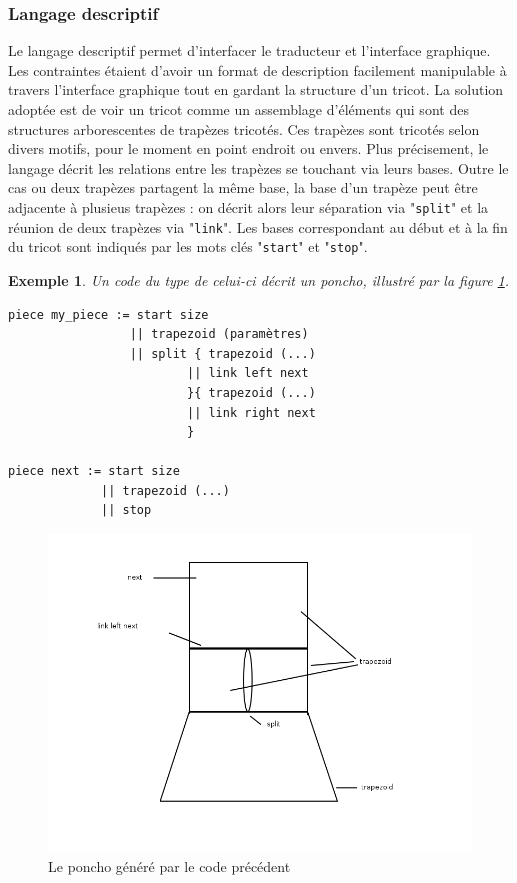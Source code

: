 \documentclass{article}
\newtheorem{ex}{Exemple}
\begin{document}
\subsubsection{Langage descriptif}

Le langage descriptif permet d'interfacer le traducteur et l'interface graphique. Les contraintes étaient d'avoir un format de description facilement manipulable à travers l'interface graphique tout en gardant la structure d'un tricot. La solution adoptée est de voir un tricot comme un assemblage d'éléments qui sont des structures arborescentes de trapèzes tricotés. Ces trapèzes sont tricotés selon divers motifs, pour le moment en point endroit ou envers. Plus précisement, le langage décrit les relations entre les trapèzes se touchant via leurs bases. Outre le cas ou deux trapèzes partagent la même base, la base d'un trapèze peut être adjacente à plusieus trapèzes : on décrit alors leur séparation via "\texttt{split}" et la réunion de deux trapèzes via "\texttt{link}". Les bases correspondant au début et à la fin du tricot sont indiqués par les mots clés "\texttt{start}" et "\texttt{stop}".

\begin{ex}
   Un code du type de celui-ci décrit un poncho, illustré par la figure \ref{poncho}.
\end{ex}

\begin{lstlisting}
piece my_piece := start size
                 || trapezoid (paramètres) 
                 || split { trapezoid (...)
                         || link left next
                         }{ trapezoid (...)
                         || link right next
                         }

piece next := start size
             || trapezoid (...)
             || stop
\end{lstlisting}

\begin{figure}[!h]
  \centering
  \includegraphics[scale=0.4]{../img/poncho.png}
  \caption{Le poncho généré par le code précédent}
  \label{poncho}
\end{figure}
\end{document}
